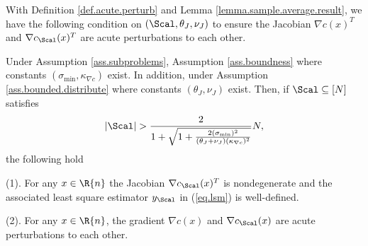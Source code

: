 
With Definition \ref{def.acute.perturb} and Lemma \ref{lemma.sample.average.result}, we have the following condition on $(\Scal,\theta_J,\nu_J)$ to ensure the Jacobian $\nabla c(x)^T$ and $\nabla c_{\Scal}(x)^T$ are acute perturbations to each other.

\begin{lemma}
\label{lemma.acute.perturb}
	Under Assumption \ref{ass.subproblems}, Assumption \ref{ass.boundness} where constants $(\sigma_{\min},\kappa_{\nabla c})$ exist. In addition, under Assumption \ref{ass.bounded.distribute} where constants $(\theta_J,\nu_J)$ exist. Then, if $\Scal\subseteq[N]$ satisfies 
	\[
	|\Scal|>\frac{2}{1+\sqrt{1+\frac{2(\sigma_{\min})^2}{(\theta_J+\nu_J)(\kappa_{\nabla c})^2}}}N ,
	\]
	the following hold 
	\bitemize 
	\item[(1).]For any $x\in\R{n}$ the Jacobian $\nabla c_{\Scal}(x)^T$ is nondegenerate and the associated least square estimator $y_{\Scal}$ in (\ref{eq.lsm}) is well-defined.
	\item[(2).] For any $x\in\R{n}$, the gradient $\nabla c(x)$ and $\nabla c_{\Scal}(x)$ are acute perturbations to each other.	
	\eitemize
\end{lemma}


